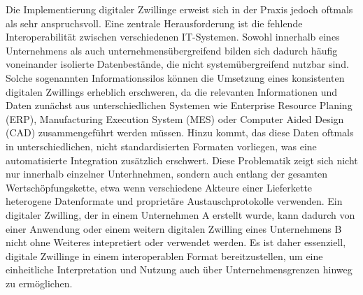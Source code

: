 
Die Implementierung digitaler Zwillinge erweist sich in der Praxis jedoch oftmals als sehr anspruchsvoll.
Eine zentrale Herausforderung ist die fehlende Interoperabilität zwischen verschiedenen IT-Systemen.
Sowohl innerhalb eines Unternehmens als auch unternehmensübergreifend bilden sich dadurch häufig voneinander isolierte Datenbestände, die nicht systemübergreifend nutzbar sind.
Solche sogenannten Informationssilos können die Umsetzung eines konsistenten digitalen Zwillings erheblich erschweren, da die relevanten Informationen und Daten zunächst aus unterschiedlichen Systemen wie Enterprise Resource Planing (ERP), Manufacturing Execution System (MES) oder Computer Aided Design (CAD) zusammengeführt werden müssen.
Hinzu kommt, das diese Daten oftmals in unterschiedlichen, nicht standardisierten Formaten vorliegen, was eine automatisierte Integration zusätzlich erschwert.
Diese Problematik zeigt sich nicht nur innerhalb einzelner Unterhnehmen, sondern auch entlang der gesamten Wertschöpfungskette, etwa wenn verschiedene Akteure einer Lieferkette heterogene Datenformate und proprietäre Austauschprotokolle verwenden.
Ein digitaler Zwilling, der in einem Unternehmen A erstellt wurde, kann dadurch von einer Anwendung oder einem weitern digitalen Zwilling eines Unternehmens B nicht ohne Weiteres intepretiert oder verwendet werden.
Es ist daher essenziell, digitale Zwillinge in einem interoperablen Format bereitzustellen, um eine einheitliche Interpretation und Nutzung auch über Unternehmensgrenzen hinweg zu ermöglichen.
\cite{DTandAASConceptsInI4.0}




